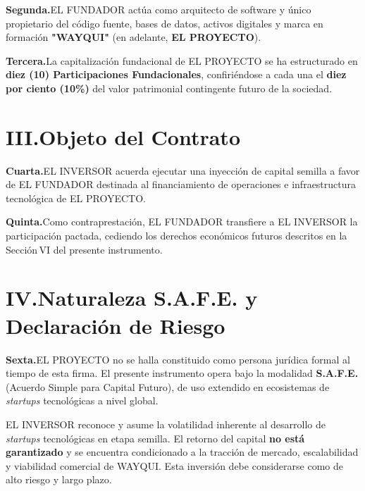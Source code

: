 \documentclass[11pt,a4paper]{article}
\begin{document}
\textbf{Segunda.}\enspace EL FUNDADOR actúa como arquitecto de software y único propietario del código fuente, bases de datos, activos digitales y marca en formación \textbf{"WAYQUI"} (en adelante, \textbf{EL PROYECTO}).

\vspace{0.4cm}
\textbf{Tercera.}\enspace La capitalización fundacional de EL PROYECTO se ha estructurado en \textbf{diez (10) Participaciones Fundacionales}, confiriéndose a cada una el \textbf{diez por ciento (10\%)} del valor patrimonial contingente futuro de la sociedad.


\section{III.\quad Objeto del Contrato}

\textbf{Cuarta.}\enspace EL INVERSOR acuerda ejecutar una inyección de capital semilla a favor de EL FUNDADOR destinada al financiamiento de operaciones e infraestructura tecnológica de EL PROYECTO.

\vspace{0.4cm}
\textbf{Quinta.}\enspace Como contraprestación, EL FUNDADOR transfiere a EL INVERSOR la participación pactada, cediendo los derechos económicos futuros descritos en la Sección\,VI del presente instrumento.


\section{IV.\quad Naturaleza S.A.F.E. y Declaración de Riesgo}

\textbf{Sexta.}\enspace EL PROYECTO no se halla constituido como persona jurídica formal al tiempo de esta firma. El presente instrumento opera bajo la modalidad \textbf{S.A.F.E.} (Acuerdo Simple para Capital Futuro), de uso extendido en ecosistemas de \textit{startups} tecnológicas a nivel global.

\vspace{0.5cm}

\begin{tcolorbox}[riskbox,
  title={\small\bfseries\color{WRed} Séptima:\enspace Advertencia de Riesgo},
  coltitle=WRed,
  attach boxed title to top left={yshift=-\tcboxedtitleheight/2, xshift=12pt},
  boxed title style={colback=white, colframe=WRed, boxrule=0.6pt, arc=2pt}]
  EL INVERSOR reconoce y asume la volatilidad inherente al desarrollo de \textit{startups} tecnológicas en etapa semilla. El retorno del capital \textbf{no está garantizado} y se encuentra condicionado a la tracción de mercado, escalabilidad y viabilidad comercial de WAYQUI. Esta inversión debe considerarse como de alto riesgo y largo plazo.
\end{tcolorbox}
\end{document}
